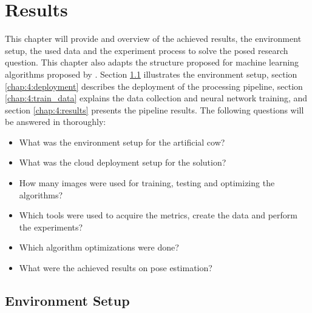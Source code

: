 
\chapter{Results}\label{chap:evaluation}


    
This chapter will provide and overview of the achieved results, the environment setup, the used data and the experiment process to solve the posed research question. 
This chapter also adapts the structure proposed for machine learning algorithms proposed by \cite{luckert2016using}.
Section \ref{chap:4:setup} illustrates the environment setup, 
section \ref{chap:4:deployment} describes the deployment of the processing pipeline, 
section \ref{chap:4:train_data} explains the data collection and neural network training, 
and section \ref{chap:4:results} presents the pipeline results. The following questions will be answered in thoroughly:
\begin{itemize}
    \item What was the environment setup for the artificial cow?
    \item What was the cloud deployment setup for the solution?
    \item How many images were used for training, testing and optimizing the algorithms?
    \item Which tools were used to acquire the metrics, create the data and perform the experiments?
    \item Which algorithm optimizations were done?
    \item What were the achieved results on pose estimation?
\end{itemize}

\section{Environment Setup}\label{chap:4:setup}

